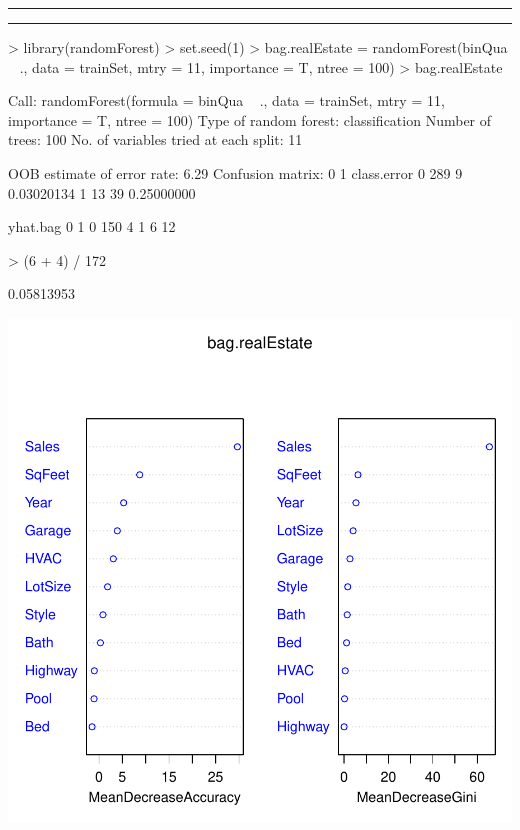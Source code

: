 \documentclass[a4paper]{article}
\newcommand{\question}[2] {\vspace{.25in} \hrule\vspace{0.5em}
\noindent{\bf #1: #2} \vspace{0.5em}
\hrule \vspace{.10in}}
\begin{document}
\newpage
\question{2}{Bagging}
\begin{Schunk}
\begin{Sinput}
> library(randomForest)
> set.seed(1)
> bag.realEstate = randomForest(binQua ~ ., data = trainSet, mtry = 11, importance = T, ntree = 100)
> bag.realEstate
\end{Sinput}
\begin{Soutput}
Call:
 randomForest(formula = binQua ~ ., data = trainSet, mtry = 11,      importance = T, ntree = 100) 
               Type of random forest: classification
                     Number of trees: 100
No. of variables tried at each split: 11

        OOB estimate of  error rate: 6.29%
Confusion matrix:
    0  1 class.error
0 289  9  0.03020134
1  13 39  0.25000000
\end{Soutput}
\begin{Soutput}
yhat.bag   0   1
       0 150   4
       1   6  12
\end{Soutput}
\begin{Sinput}
> (6 + 4) / 172
\end{Sinput}
\begin{Soutput}
[1] 0.05813953
\end{Soutput}
\end{Schunk}
\includegraphics{tree-2}
\end{document}
